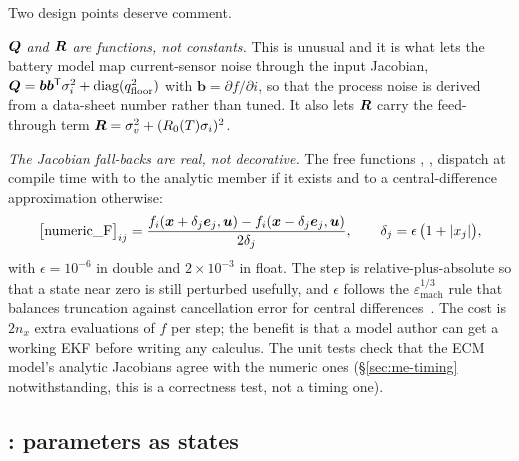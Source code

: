 Two design points deserve comment.

\emph{$\bm{Q}$ and $\bm{R}$ are functions, not constants.} This is unusual and it is what lets the
battery model map current-sensor noise through the input Jacobian,
$\bm{Q} = \bm b\bm b^{\mathsf{T}}\sigma_i^2 + \operatorname{diag}(q_{\text{floor}}^2)$ with $\bm b = \partial f/\partial i$,
so that the process noise is derived from a data-sheet number rather than tuned. It also lets
$\bm{R}$ carry the feed-through term $\bm{R} = \sigma_v^2 + (R_0(T)\sigma_i)^2$.

\emph{The Jacobian fall-backs are real, not decorative.} The free functions
, ,  dispatch at compile time with  to
the analytic member if it exists and to a central-difference approximation otherwise:
\begin{equation}
\bigl[\text{numeric\_F}\bigr]_{ij} = \frac{f_i(\bm{x} + \delta_j \bm e_j,\bm{u}) - f_i(\bm{x} - \delta_j\bm e_j,\bm{u})}{2\delta_j},
\qquad \delta_j = \epsilon\,\bigl(1 + \left\lvert x_j \right\rvert\bigr),
\label{eq:lib-numjac}
\end{equation}
with $\epsilon = 10^{-6}$ in double and $2\times10^{-3}$ in float. The step is relative-plus-absolute
so that a state near zero is still perturbed usefully, and $\epsilon$ follows the
$\varepsilon_{\text{mach}}^{1/3}$ rule that balances truncation against cancellation error for
central differences~\cite{golubvanloan2013}. The cost is $2n_x$ extra evaluations of $f$ per step;
the benefit is that a model author can get a working EKF before writing any calculus. The unit
tests check that the ECM model's analytic Jacobians agree with the numeric ones
(\S\ref{sec:me-timing} notwithstanding, this is a correctness test, not a timing one).

\subsection{: parameters as states}

